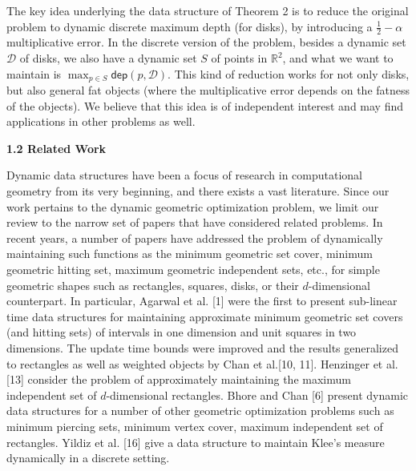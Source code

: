 \documentclass[10pt,a4paper]{article}
\begin{document}
\par
\par
\par
The key idea underlying the data structure of Theorem 2 is to reduce the original problem to dynamic discrete maximum depth (for disks), by introducing a $\frac{1}{2}-\alpha$ multiplicative error. In the discrete version of the problem, besides a dynamic set $\mathcal{D}$ of disks, we also have a dynamic set $S$ of points in $\mathbb{R}^{2}$, and what we want to maintain is $\max_{p\in S}\mathsf{dep}(p,\mathcal{D})$. This kind of reduction works for not only disks, but also general fat objects (where the multiplicative error depends on the fatness of the objects). We believe that this idea is of independent interest and may find applications in other problems as well.
\par
\par
\par\medskip\noindent\textbf{1.2 Related Work}\par
Dynamic data structures have been a focus of research in computational geometry from its very beginning, and there exists a vast literature. Since our work pertains to the dynamic geometric optimization problem, we limit our review to the narrow set of papers that have considered related problems. In recent years, a number of papers have addressed the problem of dynamically maintaining such functions as the minimum geometric set cover, minimum geometric hitting set, maximum geometric independent sets, etc., for simple geometric shapes such as rectangles, squares, disks, or their $d$-dimensional counterpart. In particular, Agarwal et al. [1] were the first to present sub-linear time data structures for maintaining approximate minimum geometric set covers (and hitting sets) of intervals in one dimension and unit squares in two dimensions. The update time bounds were improved and the results generalized to rectangles as well as weighted objects by Chan et al.[10, 11]. Henzinger et al. [13] consider the problem of approximately maintaining the maximum independent set of $d$-dimensional rectangles. Bhore and Chan [6] present dynamic data structures for a number of other geometric optimization problems such as minimum piercing sets, minimum vertex cover, maximum independent set of rectangles. Yildiz et al. [16] give a data structure to maintain Klee’s measure dynamically in a discrete setting.
\par
\par
\end{document}
